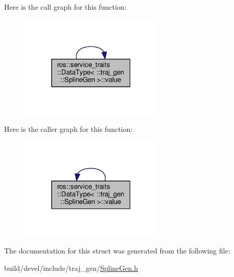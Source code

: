 Here is the call graph for this function\+:
\nopagebreak
\begin{figure}[H]
\begin{center}
\leavevmode
\includegraphics[width=195pt]{structros_1_1service__traits_1_1_data_type_3_01_1_1traj__gen_1_1_spline_gen_01_4_aa91f4492b3cdee93fc56964c34c38101_cgraph}
\end{center}
\end{figure}




Here is the caller graph for this function\+:
\nopagebreak
\begin{figure}[H]
\begin{center}
\leavevmode
\includegraphics[width=195pt]{structros_1_1service__traits_1_1_data_type_3_01_1_1traj__gen_1_1_spline_gen_01_4_aa91f4492b3cdee93fc56964c34c38101_icgraph}
\end{center}
\end{figure}




The documentation for this struct was generated from the following file\+:\begin{DoxyCompactItemize}
\item 
build/devel/include/traj\+\_\+gen/\hyperlink{_spline_gen_8h}{Spline\+Gen.\+h}\end{DoxyCompactItemize}
